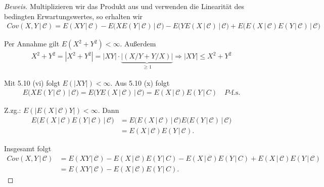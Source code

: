 \documentclass[10pt]{article}
\newcommand{\C}{\mathcal{C}}
\newcommand{\gap}{\,\vert\,}
\begin{document}
\begin{proof}[Beweis]  
	Multiplizieren wir das Produkt aus und verwenden die Linearität des bedingten Erwartungswertes, so erhalten wir
	\begin{align*}
		Cov(X,Y \gap \C) = E(XY \gap \C) - E\big(XE(Y \gap \C) \gap \C \big) - E\big(YE(X \gap \C) \gap \C \big) 
																			 + E\big( E(X \gap \C)E(Y \gap \C) \gap \C \big)
	\end{align*}

	Per Annahme gilt $E(X^2 + Y^2) < \infty$. Außerdem
	\begin{align*}
		X^2+Y^2 = |X^2+Y^2| = |XY|\cdot \underbrace{|(X/Y + Y/X)|}_{\geq 1} \Longrightarrow |XY| \leq X^2+Y^2 
	\end{align*} 

	Mit 5.10 (vi) folgt $E(|XY|) < \infty$. Aus 5.10 (x) folgt 
	\begin{align*}
		E\big(XE(Y \gap \C) \gap \C \big) = E\big(YE(X \gap \C) \gap \C \big) = E(X \gap \C) E(Y \gap C) \quad\text{$P$-f.s.}
	\end{align*}

	Z.zg.: $E(|E(X\gap \C)Y|) < \infty$. Dann 
	\begin{align*}
		E\big( E(X \gap \C)E(Y \gap \C) \gap \C \big) &= E\big( E(X \gap \C) \gap \C \big)E\big( E(Y \gap \C) \gap \C \big) \\
													  &= E(X \gap \C) E(Y \gap \C).
	\end{align*}

	Insgesamt folgt 
	\begin{align*}
		Cov(X,Y \gap \C) &= E(XY \gap \C) - E(X \gap \C) E(Y \gap C) - E(X \gap \C) E(Y \gap C) + E(X \gap \C) E(Y \gap \C) \\
						 &= E(XY \gap \C) - E(X \gap \C) E(Y \gap C).
	\end{align*}
\end{proof}
\end{document}
